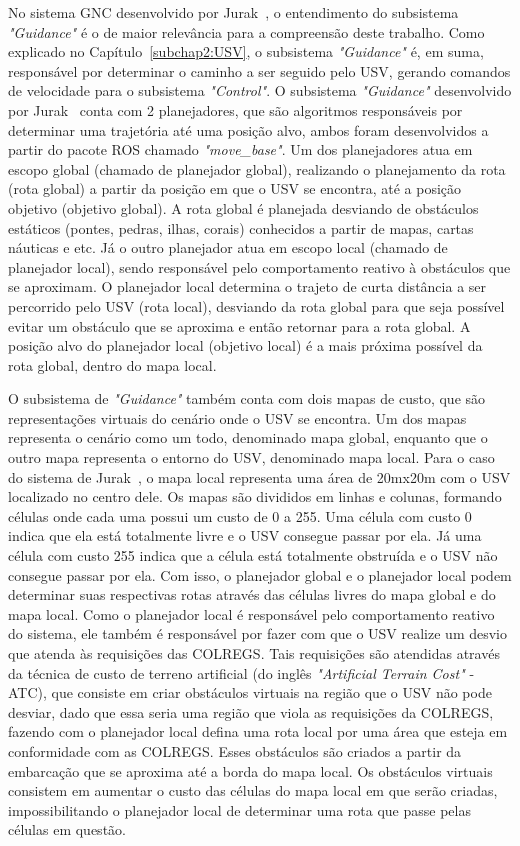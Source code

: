         No sistema GNC desenvolvido por Jurak~\cite{Jurak2020COLREGS}, o entendimento do subsistema \textit{"Guidance"} é o de maior relevância para a compreensão deste trabalho. Como explicado no Capítulo~\ref{subchap2:USV}, o subsistema \textit{"Guidance"} é, em suma, responsável por determinar o caminho a ser seguido pelo USV, gerando comandos de velocidade para o subsistema \textit{"Control"}. O subsistema \textit{"Guidance"} desenvolvido por Jurak~\cite{Jurak2020COLREGS} conta com 2 planejadores, que são algoritmos responsáveis por determinar uma trajetória até uma posição alvo, ambos foram desenvolvidos a partir do pacote ROS chamado \textit{"move\_base"}. Um dos planejadores atua em escopo global (chamado de planejador global), realizando o planejamento da rota (rota global) a partir da posição em que o USV se encontra, até a posição objetivo (objetivo global). A rota global é planejada desviando de obstáculos estáticos (pontes, pedras, ilhas, corais) conhecidos a partir de mapas, cartas náuticas e etc. Já o outro planejador atua em escopo local (chamado de planejador local), sendo responsável pelo comportamento reativo à obstáculos que se aproximam. O planejador local determina o trajeto de curta 
        distância a ser percorrido pelo USV (rota local), desviando da rota global para que seja possível evitar um obstáculo que se aproxima e então retornar para a rota global. A posição alvo do planejador local (objetivo local) é a mais próxima possível da rota global, dentro do mapa local.

       O subsistema de \textit{"Guidance"} também conta com dois mapas de custo, que são representações virtuais do cenário onde o USV se encontra. Um dos mapas representa o cenário como um todo, denominado mapa global, enquanto que o outro mapa representa o entorno do USV, denominado mapa local. Para o caso do sistema de Jurak~\cite{Jurak2020COLREGS}, o mapa local representa uma área de 20mx20m com o USV localizado no centro dele. Os mapas são divididos em linhas e colunas, formando células onde cada uma possui um custo de 0 a 255. Uma célula com custo 0 indica que ela está totalmente livre e o USV consegue passar por ela. Já uma célula com custo 255 indica que a célula está totalmente obstruída e o USV não consegue passar por ela. Com isso, o planejador global e o planejador local podem determinar suas respectivas rotas através das células livres do mapa global e do mapa local. Como o planejador local é responsável pelo comportamento reativo do sistema, ele também é responsável por fazer com que o USV realize um desvio que atenda às requisições das COLREGS. Tais requisições são atendidas através da técnica de custo de terreno artificial (do inglês \textit{"Artificial Terrain Cost"} - ATC), que consiste em criar obstáculos virtuais na região que o USV não pode desviar, dado que essa seria uma região que viola as requisições da COLREGS, fazendo com o planejador local defina uma rota local por uma área que esteja em conformidade com as COLREGS. Esses obstáculos são criados a partir da embarcação que se aproxima até a borda do mapa local. Os obstáculos virtuais consistem em aumentar o custo das células do mapa local em que serão criadas, impossibilitando o planejador local de determinar uma rota que passe pelas células em questão. 
       
